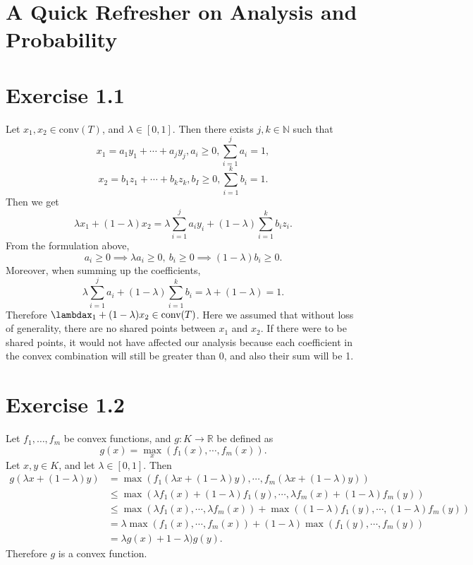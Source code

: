 \section{A Quick Refresher on Analysis and Probability}

\section*{Exercise 1.1}
Let $x_1, x_2 \in \text{conv}(T)$, and $\lambda \in [0, 1]$. Then there exists $j, k \in \mathbb{N}$ such that 
\[ x_1 = a_1 y_1 + \cdots + a_j y_j, a_i \geq 0, \sum_{i = 1}^{j} a_i = 1, \]
\[ x_2 = b_1 z_1 + \cdots + b_k z_k, b_I \geq 0, \sum_{i = 1}^{k} b_i = 1. \]
Then we get 
\[ \lambda x_1 + (1 - \lambda) x_2 
= \lambda \sum_{i = 1}^{j} a_i y_i + (1 - \lambda)\sum_{i = 1}^{k} b_i z_i. \]
From the formulation above, 
\[ a_i \geq 0 \implies \lambda a_i \geq 0, \ b_i \geq 0 \implies (1 - \lambda) b_i \geq 0. \]
Moreover, when summing up the coefficients, 
\[ \lambda \sum_{i = 1}^{j} a_i + (1 - \lambda) \sum_{i = 1}^{k} b_i = \lambda + (1 - \lambda) = 1. \]
Therefore $\lambdax_1 + (1 - \lambda)x_2 \in \text{conv}(T)$. Here we assumed that without loss of generality, 
there are no shared 
points between $x_1$ and $x_2$. If there were to be shared points, it would not have affected our analysis 
because each coefficient 
in the convex combination will still be greater than 0, and also their sum will be 1.


\newpage
\section*{Exercise 1.2}
Let $f_1, \dots, f_m$ be convex functions, and $g: K \to \mathbb{R}$ be defined as 
\[ g(x) = \max_{x}(f_1(x), \cdots, f_m(x)). \]
Let $x, y \in K$, and let $\lambda \in [0, 1]$. Then 
\begin{align*}
	g(\lambda x + (1 - \lambda)y) 
	&= \max_{}(f_1(\lambda x + (1 - \lambda)y), \cdots, f_m(\lambda x + (1 - \lambda)y)) \\
	&\leq \max_{}(\lambda f_1(x) + (1 - \lambda)f_1(y), \cdots, \lambda f_m(x) + (1 - \lambda) f_m(y)) \\
	&\leq \max_{}(\lambda f_1(x), \cdots, \lambda f_m(x)) + \max_{}((1 - \lambda)f_1(y), \cdots, (1 - \lambda)f_m(y)) \\
	&= \lambda \max_{}(f_1(x), \cdots, f_m(x)) + (1 - \lambda) \max_{}(f_1(y), \cdots, f_m(y)) \\
	&= \lambda g(x) + 1 - \lambda) g(y).
\end{align*}
Therefore $g$ is a convex function.


